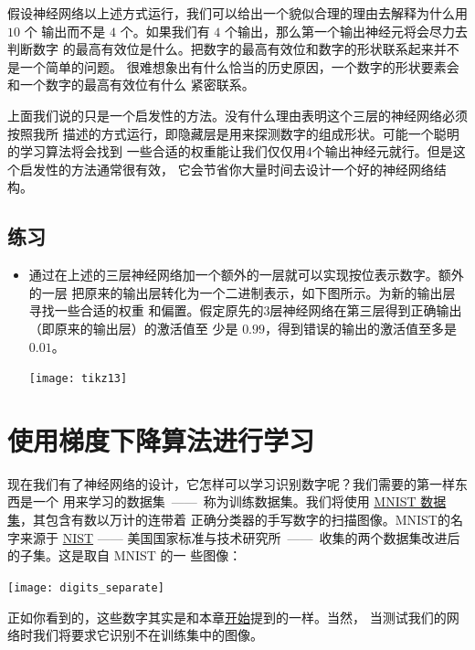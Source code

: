 假设神经网络以上述方式运行，我们可以给出一个貌似合理的理由去解释为什么用 $10$ 个
输出而不是 $4$ 个。如果我们有 $4$ 个输出，那么第一个输出神经元将会尽力去判断数字
的最高有效位是什么。把数字的最高有效位和数字的形状联系起来并不是一个简单的问题。
很难想象出有什么恰当的历史原因，一个数字的形状要素会和一个数字的最高有效位有什么
紧密联系。

上面我们说的只是一个启发性的方法。没有什么理由表明这个三层的神经网络必须按照我所
描述的方式运行，即隐藏层是用来探测数字的组成形状。可能一个聪明的学习算法将会找到
一些合适的权重能让我们仅仅用4个输出神经元就行。但是这个启发性的方法通常很有效，
它会节省你大量时间去设计一个好的神经网络结构。

\subsection*{练习}

\begin{itemize}
\item 通过在上述的三层神经网络加一个额外的一层就可以实现按位表示数字。额外的一层
  把原来的输出层转化为一个二进制表示，如下图所示。为新的输出层寻找一些合适的权重
  和偏置。假定原先的3层神经网络在第三层得到正确输出（即原来的输出层）的激活值至
  少是 $0.99$，得到错误的输出的激活值至多是 $0.01$。
  \begin{center}
    \texttt{[image: tikz13]}
  \end{center}
\end{itemize}

\section{使用梯度下降算法进行学习}
\label{sec:learning_with_gradient_descent}

现在我们有了神经网络的设计，它怎样可以学习识别数字呢？我们需要的第一样东西是一个
用来学习的数据集~——~称为训练数据集。我们将使用
\href{http://yann.lecun.com/exdb/mnist/}{MNIST 数据集}，其包含有数以万计的连带着
正确分类器的手写数字的扫描图像。MNIST的名字来源于
\href{http://en.wikipedia.org/wiki/National_Institute_of_Standards_and_Technology}{NIST}
—— 美国国家标准与技术研究所~——~收集的两个数据集改进后的子集。这是取自 MNIST 的一
些图像：
\begin{center}
  \texttt{[image: digits\_separate]}
\end{center}

正如你看到的，这些数字其实是和本章\hyperref[fig:digits]{开始}提到的一样。当然，
当测试我们的网络时我们将要求它识别不在训练集中的图像。

